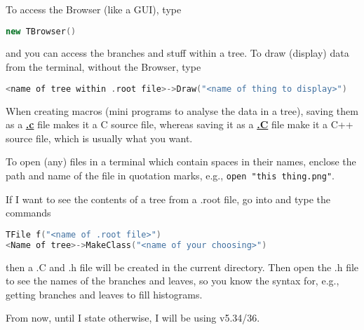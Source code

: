 To access the \ROOT Browser (like a GUI), type

\begin{lstlisting}[belowskip=-0.7cm, language=C++, numbers=none]
new TBrowser()
\end{lstlisting}

and you can access the branches and stuff within a tree. To draw (display) data from the terminal, without the Browser, type

\begin{lstlisting}[belowskip=-0.7cm, language=C++, numbers=none]
<name of tree within .root file>->Draw("<name of thing to display>")
\end{lstlisting}

When creating macros (mini programs to analyse the data in a tree), saving them as a \underline{\textbf{.c}} file makes it a C source file, whereas saving it as a \underline{\textbf{.C}} file make it a C++ source file, which is usually what you want.

To open (any) files in a terminal which contain spaces in their names, enclose the path and name of the file in quotation marks, e.g., \texttt{open "this thing.png"}.

If I want to see the contents of a tree from a .root file, go into \ROOT and type the commands

\begin{lstlisting}[belowskip=-0.7cm, language=C++, numbers=none]
TFile f("<name of .root file>")
<Name of tree>->MakeClass("<name of your choosing>")
\end{lstlisting}

then a .C and .h file will be created in the current directory. Then open the .h file to see the names of the branches and leaves, so you know the syntax for, e.g., getting branches and leaves to fill histograms.


From now, until I state otherwise, I will be using \ROOT v5.34/36.

